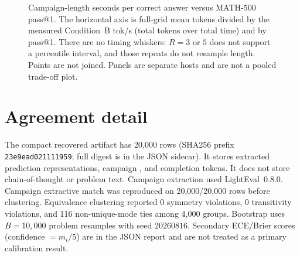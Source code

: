 \documentclass[11pt,a4paper]{article}
\begin{document}
\begin{figure}[!htbp]
\centering
{}
\caption{Campaign-length seconds per correct answer versus MATH-500 pass@1. The horizontal axis is full-grid mean tokens divided by the measured Condition~B tok/s (total tokens over total time) and by pass@1. There are no timing whiskers: $R=3$ or $5$ does not support a percentile interval, and those repeats do not resample length. Points are not joined. Panels are separate hosts and are not a pooled trade-off plot.}
\label{fig:condB-scatter}
\end{figure}

\FloatBarrier
\section{Agreement detail}
\label{app:modal}
The compact recovered artifact has 20{,}000 rows (SHA256 prefix \texttt{23e9ead021111959}; full digest is in the JSON sidecar). It stores extracted prediction representations, campaign , and completion tokens. It does not store chain-of-thought or problem text. Campaign extraction used LightEval~0.8.0. Campaign extractive match was reproduced on 20{,}000/20{,}000 rows before clustering. Equivalence clustering reported 0 symmetry violations, 0 transitivity violations, and 116 non-unique-mode ties among 4{,}000 groups. Bootstrap uses $B=10{,}000$ problem resamples with seed $20260816$. Secondary ECE/Brier scores (confidence $=m_i/5$) are in the JSON report and are not treated as a primary calibration result.
\end{document}

